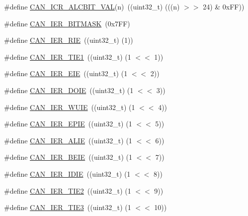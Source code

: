 \begin{DoxyCompactItemize}
\item 
\#define \hyperlink{group__CAN__17XX__40XX_ga573d99b47e23224ccaa36e473439018c}{C\-A\-N\-\_\-\-I\-C\-R\-\_\-\-A\-L\-C\-B\-I\-T\-\_\-\-V\-A\-L}(n)~((uint32\-\_\-t) (((n) $>$$>$ 24) \& 0x\-F\-F))
\item 
\#define \hyperlink{group__CAN__17XX__40XX_ga97b59b8ddd85cfd43b01fca0c9ec5a9a}{C\-A\-N\-\_\-\-I\-E\-R\-\_\-\-B\-I\-T\-M\-A\-S\-K}~(0x7\-F\-F)
\item 
\#define \hyperlink{group__CAN__17XX__40XX_ga25db0b070c10a960394a51c1374c5850}{C\-A\-N\-\_\-\-I\-E\-R\-\_\-\-R\-I\-E}~((uint32\-\_\-t) (1))
\item 
\#define \hyperlink{group__CAN__17XX__40XX_ga8acb357ce8234e896c4f4cd550beb2c8}{C\-A\-N\-\_\-\-I\-E\-R\-\_\-\-T\-I\-E1}~((uint32\-\_\-t) (1 $<$$<$ 1))
\item 
\#define \hyperlink{group__CAN__17XX__40XX_ga7c5a45cabe99423ecbbd05df116dad20}{C\-A\-N\-\_\-\-I\-E\-R\-\_\-\-E\-I\-E}~((uint32\-\_\-t) (1 $<$$<$ 2))
\item 
\#define \hyperlink{group__CAN__17XX__40XX_ga0040248415efe4811e416b4265873a70}{C\-A\-N\-\_\-\-I\-E\-R\-\_\-\-D\-O\-I\-E}~((uint32\-\_\-t) (1 $<$$<$ 3))
\item 
\#define \hyperlink{group__CAN__17XX__40XX_gad9eff97f356d550aa52f0545e3c459d2}{C\-A\-N\-\_\-\-I\-E\-R\-\_\-\-W\-U\-I\-E}~((uint32\-\_\-t) (1 $<$$<$ 4))
\item 
\#define \hyperlink{group__CAN__17XX__40XX_gae01dedfd23e22e9fb22466c4a8ef7b9d}{C\-A\-N\-\_\-\-I\-E\-R\-\_\-\-E\-P\-I\-E}~((uint32\-\_\-t) (1 $<$$<$ 5))
\item 
\#define \hyperlink{group__CAN__17XX__40XX_ga71c94a127f0774689febf52d4e08f974}{C\-A\-N\-\_\-\-I\-E\-R\-\_\-\-A\-L\-I\-E}~((uint32\-\_\-t) (1 $<$$<$ 6))
\item 
\#define \hyperlink{group__CAN__17XX__40XX_ga9f2bbfc38e14781668ae928252b3639d}{C\-A\-N\-\_\-\-I\-E\-R\-\_\-\-B\-E\-I\-E}~((uint32\-\_\-t) (1 $<$$<$ 7))
\item 
\#define \hyperlink{group__CAN__17XX__40XX_gac81c8d3f2c4417b30af2236ae66c4926}{C\-A\-N\-\_\-\-I\-E\-R\-\_\-\-I\-D\-I\-E}~((uint32\-\_\-t) (1 $<$$<$ 8))
\item 
\#define \hyperlink{group__CAN__17XX__40XX_ga8168f7849c90eae9dae59835aac5fef8}{C\-A\-N\-\_\-\-I\-E\-R\-\_\-\-T\-I\-E2}~((uint32\-\_\-t) (1 $<$$<$ 9))
\item 
\#define \hyperlink{group__CAN__17XX__40XX_ga4d555856f1c80fe21c7fbd0858ec2118}{C\-A\-N\-\_\-\-I\-E\-R\-\_\-\-T\-I\-E3}~((uint32\-\_\-t) (1 $<$$<$ 10))
\item 
$$
\end{DoxyCompactItemize}

